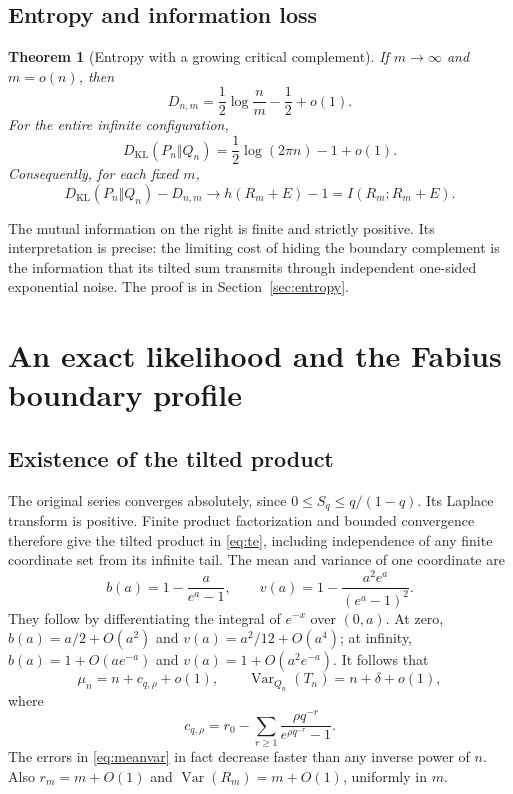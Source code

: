 \documentclass[11pt,a4paper]{article}
\numberwithin{equation}{section}
\newtheorem{theorem}{Theorem}[section]
\theoremstyle{definition}
\theoremstyle{remark}
\newcommand{\Var}{\operatorname{Var}}
\newcommand{\KL}{D_{\mathrm{KL}}}
\begin{document}
\subsection{Entropy and information loss}
\begin{theorem}[Entropy with a growing critical complement]\label{thm:entropy}
If $m\to\infty$ and $m=o(n)$, then
\begin{equation}\label{eq:growingkl}
D_{n,m}=\frac12\log\frac nm-\frac12+o(1).
\end{equation}
For the entire infinite configuration,
\begin{equation}\label{eq:fullkl}
\KL(P_n\Vert Q_n)=\frac12\log(2\pi n)-1+o(1).
\end{equation}
Consequently, for each fixed $m$,
\begin{equation}\label{eq:infogap}
\KL(P_n\Vert Q_n)-D_{n,m}
 \longrightarrow h(R_m+E)-1=I(R_m;R_m+E).
\end{equation}
\end{theorem}
The mutual information on the right is finite and strictly positive.
Its interpretation is precise: the limiting cost of hiding the boundary
complement is the information that its tilted sum transmits through
independent one-sided exponential noise. The proof is in
Section~\ref{sec:entropy}.

\section{An exact likelihood and the Fabius boundary profile}
\label{sec:likelihood}

\subsection{Existence of the tilted product}
The original series converges absolutely, since
$0\le S_q\le q/(1-q)$. Its Laplace transform is positive. Finite product
factorization and bounded convergence therefore give the tilted product
in \eqref{eq:te}, including independence of any finite coordinate set
from its infinite tail. The mean and variance of one coordinate are
\begin{equation}\label{eq:moments}
b(a)=1-\frac a{e^a-1},\qquad
v(a)=1-\frac{a^2e^a}{(e^a-1)^2}.
\end{equation}
They follow by differentiating the integral of $e^{-x}$ over $(0,a)$.
At zero, $b(a)=a/2+O(a^2)$ and $v(a)=a^2/12+O(a^4)$; at infinity,
$b(a)=1+O(ae^{-a})$ and $v(a)=1+O(a^2e^{-a})$.
It follows that
\begin{equation}\label{eq:meanvar}
\mu_n=n+c_{q,\rho}+o(1),\qquad
\Var_{Q_n}(T_n)=n+\delta+o(1),
\end{equation}
where
\[
c_{q,\rho}=r_0-\sum_{r\ge1}\frac{\rho q^{-r}}{e^{\rho q^{-r}}-1}.
\]
The errors in \eqref{eq:meanvar} in fact decrease faster than any inverse
power of $n$. Also $r_m=m+O(1)$ and $\Var(R_m)=m+O(1)$, uniformly in $m$.
\end{document}
